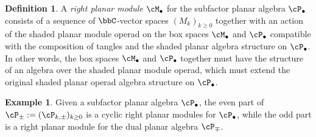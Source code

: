 \documentclass[11pt]{article}
\theoremstyle{plain}
\theoremstyle{definition}
\newtheorem{defn}[thm]{Definition}
\newtheorem{ex}[thm]{Example}
\begin{document}
\begin{defn}
A \emph{right planar module} $\cM_\bullet$ for the subfactor planar algebra $\cP_\bullet$ consists of a sequence of $\bbC$-vector spaces $(M_k)_{k\geq 0}$
together with an action of the shaded planar module operad on the box spaces $\cM_\bullet$ and $\cP_\bullet$ compatible with the composition of tangles and the shaded planar algebra structure on $\cP_\bullet$. In other words, the box spaces $\cM_\bullet$ and $\cP_\bullet$ together must have the structure of an algebra over the shaded planar module operad, which must extend the original shaded planar operad algebra structure on $\cP_\bullet$. 
\end{defn}

\begin{ex}
	Given a subfactor planar algebra $\cP_\bullet$, the even part of $\cP_\pm :=( \cP_{k,\pm})_{k\geq 0}$ is a cyclic right planar modules for $\cP_\bullet$, while the odd part is a right planar module for the dual planar algebra $\cP_{\mp}$. 
\end{ex}
\end{document}

